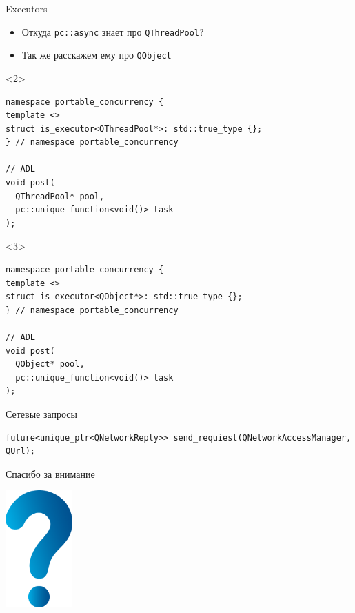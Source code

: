 \documentclass[aspectratio=169,pdf,hyperref={unicode},14pt]{beamer}
\begin{document}
\begin{frame}[fragile,t]{Executors}
 \begin{itemize}
  \item<1-> Откуда \texttt{pc::async} знает про \texttt{QThreadPool}?
  \item<3> Так же расскажем ему про \texttt{QObject}
 \end{itemize}
 \begin{onlyenv}<2>
  \begin{lstlisting}[style=cppcode]
namespace portable_concurrency {
template <>
struct is_executor<QThreadPool*>: std::true_type {};
} // namespace portable_concurrency

// ADL
void post(
  QThreadPool* pool,
  pc::unique_function<void()> task
);
  \end{lstlisting}
 \end{onlyenv}
 \begin{onlyenv}<3>
  \begin{lstlisting}[style=cppcode]
namespace portable_concurrency {
template <>
struct is_executor<QObject*>: std::true_type {};
} // namespace portable_concurrency

// ADL
void post(
  QObject* pool,
  pc::unique_function<void()> task
);
  \end{lstlisting}
 \end{onlyenv}
\end{frame}

\begin{frame}[fragile,t]{Сетевые запросы}
 \begin{lstlisting}[style=cppcode]
future<unique_ptr<QNetworkReply>> send_requiest(QNetworkAccessManager, QUrl);
 \end{lstlisting}
\end{frame}

\begin{frame}{Спасибо за внимание}
\centerline{\includegraphics[height=4.5cm]{question_mark_blue.png}}
\end{frame}
\end{document}
